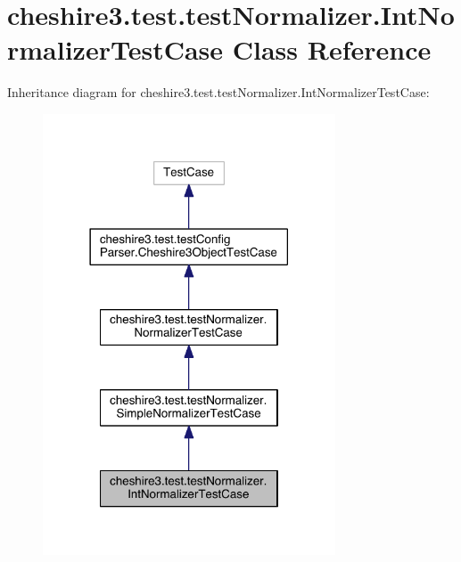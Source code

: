 \hypertarget{classcheshire3_1_1test_1_1test_normalizer_1_1_int_normalizer_test_case}{\section{cheshire3.\-test.\-test\-Normalizer.\-Int\-Normalizer\-Test\-Case Class Reference}
\label{classcheshire3_1_1test_1_1test_normalizer_1_1_int_normalizer_test_case}
}


Inheritance diagram for cheshire3.\-test.\-test\-Normalizer.\-Int\-Normalizer\-Test\-Case\-:
\nopagebreak
\begin{figure}[H]
\begin{center}
\leavevmode
\includegraphics[width=246pt]{classcheshire3_1_1test_1_1test_normalizer_1_1_int_normalizer_test_case__inherit__graph}
\end{center}
\end{figure}


